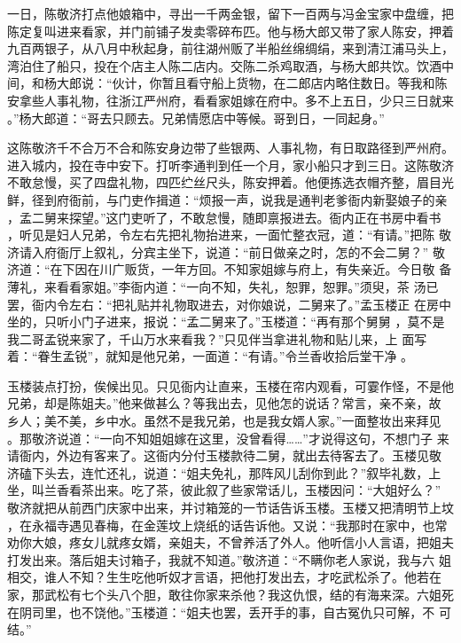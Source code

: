 一日，陈敬济打点他娘箱中，寻出一千两金银，留下一百两与冯金宝家中盘缠，把
陈定复叫进来看家，并门前铺子发卖零碎布匹。他与杨大郎又带了家人陈安，押着
九百两银子，从八月中秋起身，前往湖州贩了半船丝绵绸绢，来到清江浦马头上，
湾泊住了船只，投在个店主人陈二店内。交陈二杀鸡取酒，与杨大郎共饮。饮酒中
间，和杨大郎说：“伙计，你暂且看守船上货物，在二郎店内略住数日。等我和陈
安拿些人事礼物，往浙江严州府，看看家姐嫁在府中。多不上五日，少只三日就来
。”杨大郎道：“哥去只顾去。兄弟情愿店中等候。哥到日，一同起身。”

这陈敬济千不合万不合和陈安身边带了些银两、人事礼物，有日取路径到严州府。
进入城内，投在寺中安下。打听李通判到任一个月，家小船只才到三日。这陈敬济
不敢怠慢，买了四盘礼物，四匹纻丝尺头，陈安押着。他便拣选衣帽齐整，眉目光
鲜，径到府衙前，与门吏作揖道：“烦报一声，说我是通判老爹衙内新娶娘子的亲
，孟二舅来探望。”这门吏听了，不敢怠慢，随即禀报进去。衙内正在书房中看书
，听见是妇人兄弟，令左右先把礼物抬进来，一面忙整衣冠，道：“有请。”把陈
敬济请入府衙厅上叙礼，分宾主坐下，说道：“前日做亲之时，怎的不会二舅？”
敬济道：“在下因在川广贩货，一年方回。不知家姐嫁与府上，有失亲近。今日敬
备薄礼，来看看家姐。”李衙内道：“一向不知，失礼，恕罪，恕罪。”须臾，茶
汤已罢，衙内令左右：“把礼贴并礼物取进去，对你娘说，二舅来了。”孟玉楼正
在房中坐的，只听小门子进来，报说：“孟二舅来了。”玉楼道：“再有那个舅舅
，莫不是我二哥孟锐来家了，千山万水来看我？”只见伴当拿进礼物和贴儿来，上
面写着：“眷生孟锐”，就知是他兄弟，一面道：“有请。”令兰香收拾后堂干净
。

玉楼装点打扮，俟候出见。只见衙内让直来，玉楼在帘内观看，可霎作怪，不是他
兄弟，却是陈姐夫。”他来做甚么？等我出去，见他怎的说话？常言，亲不亲，故
乡人；美不美，乡中水。虽然不是我兄弟，也是我女婿人家。”一面整妆出来拜见
。那敬济说道：“一向不知姐姐嫁在这里，没曾看得……”才说得这句，不想门子
来请衙内，外边有客来了。这衙内分付玉楼款待二舅，就出去待客去了。玉楼见敬
济磕下头去，连忙还礼，说道：“姐夫免礼，那阵风儿刮你到此？”叙毕礼数，上
坐，叫兰香看茶出来。吃了茶，彼此叙了些家常话儿，玉楼因问：“大姐好么？”
敬济就把从前西门庆家中出来，并讨箱笼的一节话告诉玉楼。玉楼又把清明节上坟
，在永福寺遇见春梅，在金莲坟上烧纸的话告诉他。又说：“我那时在家中，也常
劝你大娘，疼女儿就疼女婿，亲姐夫，不曾养活了外人。他听信小人言语，把姐夫
打发出来。落后姐夫讨箱子，我就不知道。”敬济道：“不瞒你老人家说，我与六
姐相交，谁人不知？生生吃他听奴才言语，把他打发出去，才吃武松杀了。他若在
家，那武松有七个头八个胆，敢往你家来杀他？我这仇恨，结的有海来深。六姐死
在阴司里，也不饶他。”玉楼道：“姐夫也罢，丢开手的事，自古冤仇只可解，不
可结。”

